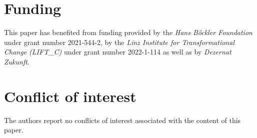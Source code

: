 \documentclass{article}
\newif\ifendfloats    %
\begin{document}
\section*{Funding}
This paper has benefited from funding provided by the \textit{Hans B\"ockler
Foundation} under grant number 2021-544-2, by the \textit{Linz Institute for
Transformational Change (LIFT\_C)} under grant number 2022-1-114 as well as by
\textit{Dezernat Zukunft}.

\section*{Conflict of interest}
The authors report no conflicts of interest associated with the content of this paper.

\medskip
\printbibliography
\ifendfloats\processdelayedfloats\fi

\appendix
\begin{refsection}

\setcounter{section}{0}
\setcounter{table}{0}
\setcounter{equation}{0}
\setcounter{figure}{0}
\ifendfloats
  \setcounter{postfigure}{0}
  \setcounter{posttable}{0}
  \renewcommand{\theposttable}{A\arabic{posttable}}
  \renewcommand*{\theHposttable}{appendix.posttable.\arabic{posttable}}
  \renewcommand{\thepostfigure}{A\arabic{postfigure}}
\fi
\renewcommand{\thetable}{A\arabic{table}}
\renewcommand*{\theHtable}{\thetable}
\renewcommand{\thefigure}{A\arabic{figure}}
\renewcommand*{\theHfigure}{\thefigure}
\renewcommand{\theequation}{A\arabic{equation}}
\renewcommand*{\theHequation}{\theequation}






\printbibliography[title={Appendix references}]

\end{refsection}

\ifendfloats
  \renewcommand{\thetable}{A\arabic{table}}
  \renewcommand*{\theHtable}{\thetable}
  \renewcommand{\thefigure}{A\arabic{figure}}
  \renewcommand*{\theHfigure}{\thefigure}
  \renewcommand{\thepostfigure}{A\arabic{postfigure}}
  \renewcommand{\theposttable}{A\arabic{posttable}}
  \renewcommand*{\theHposttable}{appendix.posttable.\arabic{posttable}}
  \processdelayedfloats
\fi
\end{document}
